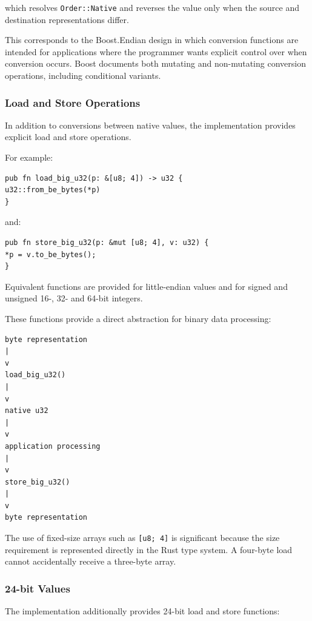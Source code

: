 which resolves \texttt{Order::Native} and reverses the value only when the source and destination representations differ.

This corresponds to the Boost.Endian design in which conversion functions are intended for applications where the 
programmer wants explicit control over when conversion occurs. Boost documents both mutating and non-mutating conversion 
operations, including conditional variants.

\subsubsection{Load and Store Operations}

In addition to conversions between native values, the implementation provides explicit load and store operations.

For example:

\begin{lstlisting}[style=rustblock]
pub fn load_big_u32(p: &[u8; 4]) -> u32 {
u32::from_be_bytes(*p)
}
\end{lstlisting}

and:

\begin{lstlisting}[style=rustblock]
pub fn store_big_u32(p: &mut [u8; 4], v: u32) {
*p = v.to_be_bytes();
}
\end{lstlisting}

Equivalent functions are provided for little-endian values and for signed and unsigned 16-, 32- and 64-bit integers.

These functions provide a direct abstraction for binary data processing:

\begin{lstlisting}[style=rustblock]
byte representation
|
v
load_big_u32()
|
v
native u32
|
v
application processing
|
v
store_big_u32()
|
v
byte representation
\end{lstlisting}

The use of fixed-size arrays such as \texttt{[u8; 4]} is significant because the size requirement is represented directly in the Rust type system. A four-byte load cannot accidentally receive a three-byte array.

\subsubsection{24-bit Values}

The implementation additionally provides 24-bit load and store functions:

